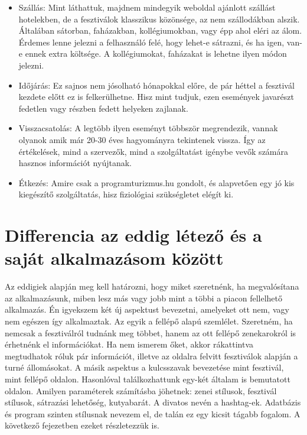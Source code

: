 \begin{itemize}
\item Szállás: Mint láthattuk, majdnem mindegyik weboldal ajánlott szállást hotelekben, de a fesztiválok klasszikus közönsége, az nem szállodákban alszik. Általában sátorban, faházakban, kollégiumokban, vagy épp ahol eléri az álom. Érdemes lenne jelezni a felhasználó felé, hogy lehet-e sátrazni, és ha igen, van-e ennek extra költsége. A kollégiumokat, faházakat is lehetne ilyen módon jelezni.

\item Időjárás: Ez sajnos nem jósolható hónapokkal előre, de pár héttel a fesztivál kezdete előtt ez is felkerülhetne. Hisz mint tudjuk, ezen események javarészt fedetlen vagy részben fedett helyeken zajlanak.

\item Visszacsatolás: A legtöbb ilyen eseményt többször megrendezik, vannak olyanok amik már 20-30 éves hagyományra tekintenek vissza. Így az értékelések, mind a szervezők, mind a szolgáltatást igénybe vevők számára hasznos információt nyújtanak.

\item Étkezés: Amire csak a programturizmus.hu gondolt, és alapvetően egy jó kis kiegészítő szolgáltatás, hisz fiziológiai szükségletet elégít ki.

\end{itemize}

\section{Differencia az eddig létező és a saját alkalmazásom között}

Az eddigiek alapján meg kell határozni, hogy miket szeretnénk, ha megvalósítana az alkalmazásunk, miben lesz más vagy jobb mint a többi a piacon fellelhető alkalmazás. Én igyekszem két új aspektust bevezetni, amelyeket ott nem, vagy nem egészen így alkalmaztak. Az egyik a fellépő alapú szemlélet. Szeretném, ha nemcsak a fesztiválról tudnánk meg többet, hanem az ott fellépő zenekarokról is érhetnénk el információkat. Ha nem ismerem őket, akkor rákattintva megtudhatok róluk pár információt, illetve az oldalra felvitt fesztiválok alapján a turné állomásokat. A másik aspektus a kulcsszavak bevezetése mint fesztivál, mint fellépő oldalon. Hasonlóval találkozhattunk egy-két általam is bemutatott oldalon. Amilyen paraméterek számításba jöhetnek: zenei stílusok, fesztivál stílusok, sátrazási lehetőség, kutyabarát. A divatos nevén a hashtag-ek. Adatbázis és program szinten stílusnak nevezem el, de talán ez egy kicsit tágabb fogalom. A következő fejezetben ezeket részletezzük is.
